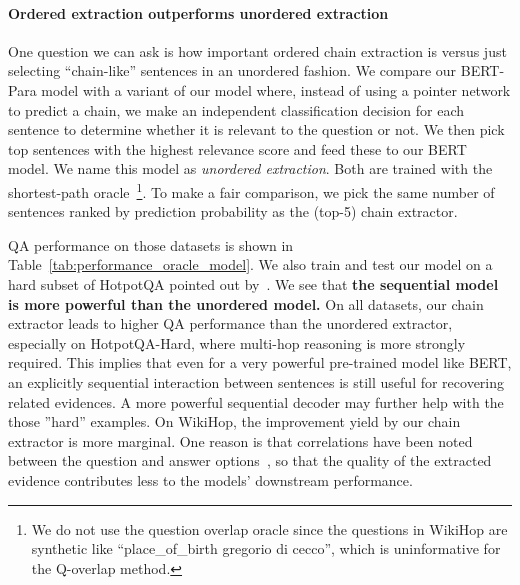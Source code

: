 \documentclass[11pt,a4paper]{article}
\begin{document}
\paragraph{Ordered extraction outperforms unordered extraction} One question we can ask is how important ordered chain extraction is versus just selecting ``chain-like'' sentences in an unordered fashion. We compare our BERT-Para model with a variant of our model where, instead of using a pointer network to predict a chain, we make an independent classification decision for each sentence to determine whether it is relevant to the question or not. We then pick top  sentences with the highest relevance score and feed these to our BERT model. We name this model as \emph{unordered extraction}. Both are trained with the shortest-path oracle~\footnote{We do not use the question overlap oracle since the questions in WikiHop are synthetic like ``place\_of\_birth gregorio di cecco'', which is uninformative for the Q-overlap method.}. To make a fair comparison, we pick the same number of sentences ranked by prediction probability as the (top-5) chain extractor. 

QA performance on those datasets is shown in Table~\ref{tab:performance_oracle_model}. We also train and test our model on a hard subset of HotpotQA pointed out by~. We see that \textbf{the sequential model is more powerful than the unordered model.} On all datasets, our chain extractor leads to higher QA performance than the unordered extractor, especially on HotpotQA-Hard, where multi-hop reasoning is more strongly required. This implies that even for a very powerful pre-trained model like BERT, an explicitly sequential interaction between sentences is still useful for recovering related evidences. A more powerful sequential decoder may further help with the those ''hard'' examples. On WikiHop, the improvement yield by our chain extractor is more marginal. One reason is that correlations have been noted between the question and answer options~\citep{chen2019understanding}, so that the quality of the extracted evidence contributes less to the models' downstream performance. 
\end{document}

